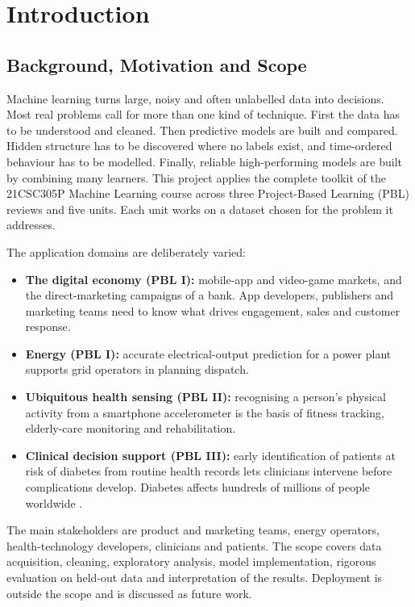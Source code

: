 \chapter{Introduction}

\section{Background, Motivation and Scope}
Machine learning turns large, noisy and often unlabelled data into decisions. Most real problems call for more than one
kind of technique. First the data has to be understood and cleaned. Then predictive models are built and compared.
Hidden structure has to be discovered where no labels exist, and time-ordered behaviour has to be modelled. Finally,
reliable high-performing models are built by combining many learners. This project applies the complete toolkit of the
21CSC305P Machine Learning course across three Project-Based Learning (PBL) reviews and five units. Each unit works on a
dataset chosen for the problem it addresses.

The application domains are deliberately varied:
\begin{itemize}
\item \textbf{The digital economy (PBL I):} mobile-app and video-game markets, and the direct-marketing campaigns of a bank.
App developers, publishers and marketing teams need to know what drives engagement, sales and customer response.
\item \textbf{Energy (PBL I):} accurate electrical-output prediction for a power plant supports grid operators in planning
dispatch.
\item \textbf{Ubiquitous health sensing (PBL II):} recognising a person's physical activity from a smartphone accelerometer
is the basis of fitness tracking, elderly-care monitoring and rehabilitation.
\item \textbf{Clinical decision support (PBL III):} early identification of patients at risk of diabetes from routine
health records lets clinicians intervene before complications develop. Diabetes affects hundreds of millions of people
worldwide \cite{ada,miotto}.
\end{itemize}
The main stakeholders are product and marketing teams, energy operators, health-technology developers, clinicians and
patients. The scope covers data acquisition, cleaning, exploratory analysis, model implementation, rigorous evaluation on
held-out data and interpretation of the results. Deployment is outside the scope and is discussed as future work.

